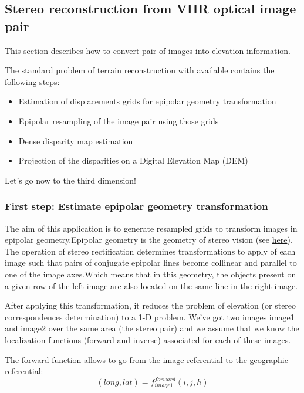 \newpage
\subsection{Stereo reconstruction from VHR optical image pair}\label{sec:stereoreconstruction}
This section describes how to convert pair of images into elevation information.

The standard problem of terrain reconstruction with available \app contains
the following steps:

\begin{itemize}
\item Estimation of displacements grids for epipolar geometry transformation
\item Epipolar resampling of the image pair using those grids
\item Dense disparity map estimation
\item Projection of the disparities on a Digital Elevation Map (DEM)
\end{itemize}

Let's go now to the third dimension!

\subsubsection{First step: Estimate epipolar geometry transformation}\label{ssec:epipolar}

The aim of this application is to generate resampled grids to transform images
in epipolar geometry.Epipolar geometry is the geometry of stereo vision
(see \href{http://en.wikipedia.org/wiki/Epipolar_geometry}{here}). The operation
of stereo rectification determines transformations to apply of each image such
that pairs of conjugate epipolar lines become collinear and parallel to one of
the image axes.Which means that in this geometry, the objects present on a given
row of the left image are also located on the same line in the right image.

After applying this transformation, it reduces the problem of elevation (or
stereo correspondences determination) to a 1-D problem.  We've got two images
image1 and image2 over the same area (the stereo pair) and we assume that we
know the localization functions (forward and inverse) associated for each of
these images.

The forward function allows to go from the image referential to the geographic
referential:
\begin{equation}
  (long,lat) = f^{forward}_{image1}(i,j,h)
\end{equation}

